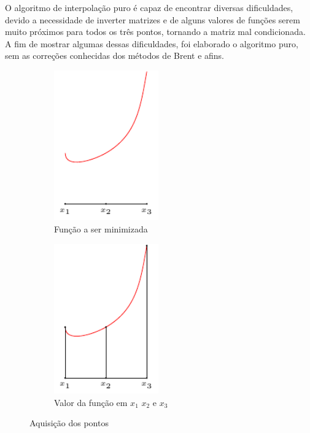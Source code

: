 O algoritmo de interpolação puro é capaz de encontrar diversas dificuldades, devido a necessidade de inverter matrizes e de alguns valores de funções serem muito próximos para todos os três pontos, tornando a matriz mal condicionada. A fim de mostrar algumas dessas dificuldades, foi elaborado o algoritmo puro, sem as correções conhecidas dos métodos de Brent e afins.
\begin{figure}[H]
	\begin{center}	
		\begin{subfigure}{.5\textwidth}
  			\centering
  			\includegraphics[width=4.5cm]{../interpol/interpol_1}
  			\caption{Função a ser minimizada}
  		\label{fig:interpol_1}
		\end{subfigure}%
		\begin{subfigure}{.5\textwidth}
  			\centering
  			\includegraphics[width=4.5cm]{../interpol/interpol_2}
  			\caption{Valor da função em $x_1$ $x_2$ e $x_3$}
  			\label{fig:interpol_2}
		\end{subfigure}	
	\end{center}
	\caption{Aquisição dos pontos}
\end{figure}

